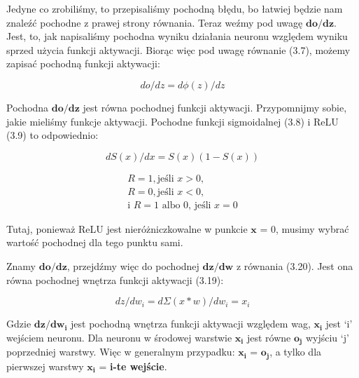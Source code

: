 \noindent Jedyne co zrobiliśmy, to przepisaliśmy pochodną błędu, bo łatwiej będzie nam znaleźć pochodne z prawej strony równania. Teraz weźmy pod uwagę $\boldsymbol{do/dz}$. Jest, to, jak napisaliśmy pochodna wyniku działania neuronu względem wyniku sprzed użycia funkcji aktywacji. Biorąc więc pod uwagę równanie (3.7), możemy zapisać pochodną funkcji aktywacji:

\begin{equation}
do/dz = d \phi(z)/dz
\end{equation}

Pochodna $\boldsymbol{do/dz}$ jest równa pochodnej funkcji aktywacji. Przypomnijmy sobie, jakie mieliśmy funkcje aktywacji. Pochodne funkcji sigmoidalnej (3.8) i ReLU (3.9) to odpowiednio:

\begin{equation}
dS(x)/dx = S(x)(1 - S(x))
\end{equation}

\begin{equation}
\begin{split}
R = 1, \text{jeśli } x > 0,
\\
R = 0, \text{jeśli } x < 0,
\\
\text{i } R = 1 \text{ albo } 0\text{, jeśli } x = 0
\end{split}
\end{equation}

\noindent Tutaj, ponieważ ReLU jest nieróżniczkowalne w punkcie $\boldsymbol{x}$ = 0, musimy wybrać wartość pochodnej dla tego punktu sami.\newline

\noindent Znamy $\boldsymbol{do/dz}$, przejdźmy więc do pochodnej $\boldsymbol{dz/dw}$ z równania (3.20). Jest ona równa pochodnej wnętrza funkcji aktywacji (3.19):

\begin{equation}
dz/dw_i = d \Sigma(x * w) / d w_i = x_i
\end{equation}

\noindent Gdzie $\boldsymbol{dz/dw_i}$ jest pochodną wnętrza funkcji aktywacji względem wag, $\boldsymbol{x_i}$ jest ‘i’ wejściem neuronu. Dla neuronu w środowej warstwie $\boldsymbol{x_i}$ jest równe $\boldsymbol{o_j}$ wyjściu ‘j’ poprzedniej warstwy. Więc w generalnym przypadku: $\boldsymbol{x_i}$ = $\boldsymbol{o_j}$, a tylko dla pierwszej warstwy $\boldsymbol{x_i}$ = \textbf{i-te wejście}.\newline\newline

